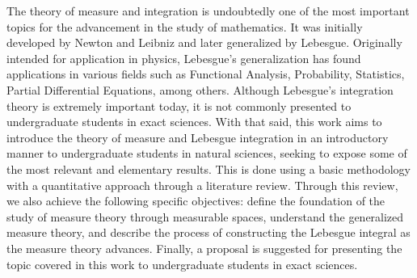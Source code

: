 The theory of measure and integration is undoubtedly one of the most important topics for the advancement in the study of mathematics. It was initially developed by Newton and Leibniz and later generalized by Lebesgue. Originally intended for application in physics, Lebesgue's generalization has found applications in various fields such as Functional Analysis, Probability, Statistics, Partial Differential Equations, among others.
Although Lebesgue's integration theory is extremely important today, it is not commonly presented to undergraduate students in exact sciences. With that said, this work aims to introduce the theory of measure and Lebesgue integration in an introductory manner to undergraduate students in natural sciences, seeking to expose some of the most relevant and elementary results. This is done using a basic methodology with a quantitative approach through a literature review.
Through this review, we also achieve the following specific objectives: define the foundation of the study of measure theory through measurable spaces, understand the generalized measure theory, and describe the process of constructing the Lebesgue integral as the measure theory advances.
Finally, a proposal is suggested for presenting the topic covered in this work to undergraduate students in exact sciences.

